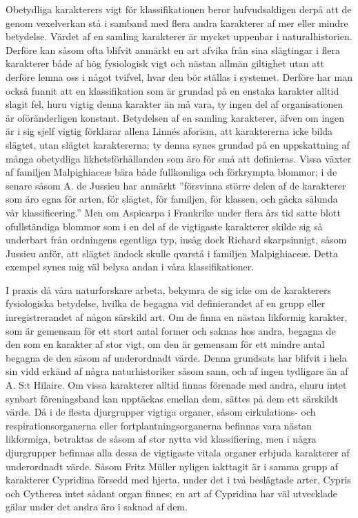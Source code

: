 Obetydliga karakterers vigt för klassifikationen beror hufvudsakligen derpå att de genom vexelverkan stå i samband med flera andra karakterer af mer eller mindre betydelse. Värdet af en samling karakterer är mycket uppenbar i naturalhistorien. Derföre kan såsom ofta blifvit anmärkt en art afvika från sina slägtingar i flera karakterer både af hög fysiologisk vigt och nästan allmän giltighet utan att derföre lemna oss i något tvifvel, hvar den bör ställas i systemet. Derföre har man också funnit att en klassifikation som är grundad på en enstaka karakter alltid slagit fel, huru vigtig denna karakter än må vara, ty ingen del af organisationen är oföränderligen konstant. Betydelsen af en samling karakterer, äfven om ingen är i sig sjelf vigtig förklarar allena Linnés aforism, att karaktererna icke bilda slägtet, utan slägtet karaktererna; ty denna synes grundad på en uppskattning af många obetydliga likhetsförhållanden som äro för små att definieras. Vissa växter af familjen Malpighiaceæ bära både fullkomliga och förkrympta blommor; i de senare såsom A. de Jussieu har anmärkt ”försvinna större delen af de karakterer som äro egna för arten, för slägtet, för familjen, för klassen, och gäcka sålunda vår klassificering.” Men om Aspicarpa i Frankrike under flera års tid satte blott ofullständiga blommor som i en del af de vigtigaste karakterer skilde sig så underbart från ordningens egentliga typ, insåg dock Richard skarpsinnigt, såsom Jussieu anför, att slägtet ändock skulle qvarstå i familjen Malpighiaceæ. Detta exempel synes mig väl belysa andan i våra klassifikationer.

I praxis då våra naturforskare arbeta, bekymra de sig icke om de karakterers fysiologiska betydelse, hvilka de begagna vid definierandet af en grupp eller inregistrerandet af någon särskild art. Om de finna en nästan likformig karakter, som är gemensam för ett stort antal former och saknas hos andra, begagna de den som en karakter af stor vigt, om den är gemensam för ett mindre antal begagna de den såsom af underordnadt värde. Denna grundsats har blifvit i hela sin vidd erkänd af några naturhistoriker såsom sann, och af ingen tydligare än af A. S:t Hilaire. Om vissa karakterer alltid finnas förenade med andra, ehuru intet synbart föreningsband kan upptäckas emellan dem, sättes på dem ett särskildt värde. Då i de flesta djurgrupper vigtiga organer, såsom cirkulations- och respirationsorganerna eller fortplantningsorganerna befinnas vara nästan likformiga, betraktas de såsom af stor nytta vid klassifiering, men i några djurgrupper befinnas alla dessa de vigtigaste vitala organer erbjuda karakterer af underordnadt värde. Såsom Fritz Müller nyligen iakttagit är i samma grupp af karakterer Cypridina försedd med hjerta, under det i två beslägtade arter, Cypris och Cytherea intet sådant organ finnes; en art af Cypridina har väl utvecklade gälar under det andra äro i saknad af dem.

